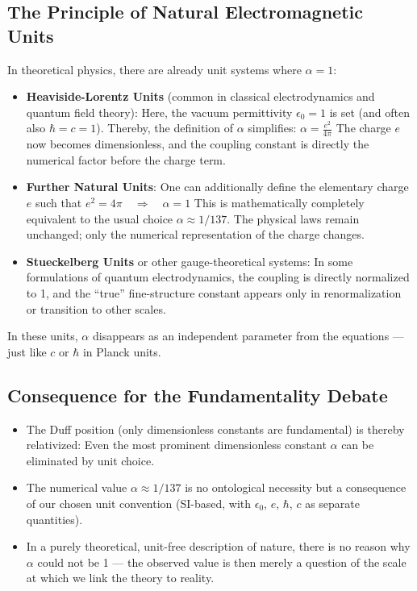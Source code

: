 	\subsection{The Principle of Natural Electromagnetic Units}
	In theoretical physics, there are already unit systems where $\alpha = 1$:
	\begin{itemize}
		\item \textbf{Heaviside-Lorentz Units} (common in classical electrodynamics and quantum field theory):  
		Here, the vacuum permittivity $\epsilon_0 = 1$ is set (and often also $\hbar = c = 1$). Thereby, the definition of $\alpha$ simplifies:
		$\alpha = \frac{e^2}{4\pi}$
		The charge $e$ now becomes dimensionless, and the coupling constant is directly the numerical factor before the charge term.
		
		\item \textbf{Further Natural Units}:  
		One can additionally define the elementary charge $e$ such that
		$e^2 = 4\pi \quad \Rightarrow \quad \alpha = 1$
		This is mathematically completely equivalent to the usual choice $\alpha \approx 1/137$. The physical laws remain unchanged; only the numerical representation of the charge changes.
		
		\item \textbf{Stueckelberg Units} or other gauge-theoretical systems:  
		In some formulations of quantum electrodynamics, the coupling is directly normalized to 1, and the ``true'' fine-structure constant appears only in renormalization or transition to other scales.
	\end{itemize}
	
	In these units, $\alpha$ disappears as an independent parameter from the equations --- just like $c$ or $\hbar$ in Planck units.
	
	\subsection{Consequence for the Fundamentality Debate}
	\begin{itemize}
		\item The Duff position (only dimensionless constants are fundamental) is thereby relativized: Even the most prominent dimensionless constant $\alpha$ can be eliminated by unit choice.
		\item The numerical value $\alpha \approx 1/137$ is no ontological necessity but a consequence of our chosen unit convention (SI-based, with $\epsilon_0$, $e$, $\hbar$, $c$ as separate quantities).
		\item In a purely theoretical, unit-free description of nature, there is no reason why $\alpha$ could not be 1 --- the observed value is then merely a question of the scale at which we link the theory to reality.
	\end{itemize}
	
